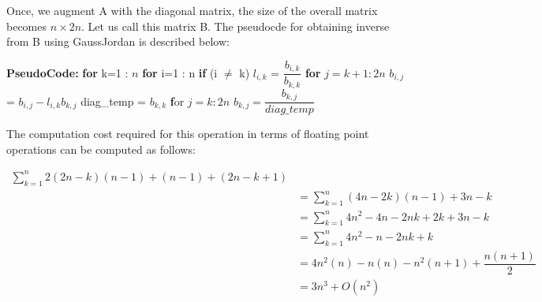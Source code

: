\documentclass{article}
\newcommand\pseudoCode{\vspace{.10in}\textbf{PseudoCode: }}
\begin{document}
Once, we augment A with  the diagonal matrix, the size of the overall matrix becomes $n \times 2n$. Let us call this matrix B. The pseudocde for obtaining inverse from B using GaussJordan is described below: \newline

\pseudoCode \newline
\hspace*{0.5cm} \textbf {for} k=1 : $n$ \newline
\hspace*{1cm}      \textbf {for} i=1 : n \newline
\hspace*{1.5cm}     \textbf {if} (i $\neq$ k) \newline
\hspace*{2cm}            $l_{i,k}$ = $\dfrac{b_{i,k}}{b_{k,k}}$ \newline
\hspace*{2cm}               \textbf {for} $j=k+1 : 2n$ \newline
\hspace*{2.5cm}               $ b_{i,j}$ =  $b_{i,j} - l_{i,k}b_{k,j}$ \newline
\hspace*{1cm}    diag\_temp = $b_{k,k}$ \newline
\hspace*{1cm}    \textbf for $j=k:2n$ \newline
\hspace*{1.5cm}                 $b_{k,j} = \dfrac{b_{k,j}}{diag\_temp}$ \newline

The computation cost required for this operation in terms of floating point operations can be computed as follows: \newline
  
\begin{align*}
  \sum_{k=1}^{n} 2(2n-k)(n-1) + (n-1) + (2n - k + 1) \\
 &= \sum_{k=1}^{n} (4n - 2k)(n-1) + 3n - k \\
 &= \sum_{k=1}^{n} 4n^2 -4n -2nk + 2k + 3n - k \\
 &= \sum_{k=1}^{n} 4n^2 -n -2nk + k \\
&= 4n^2(n) -n(n) -n^2(n+1) +\dfrac{n(n+1)}{2} \\
&= 3n^3 + O(n^2) \\
\end{align*}
\end{document}
